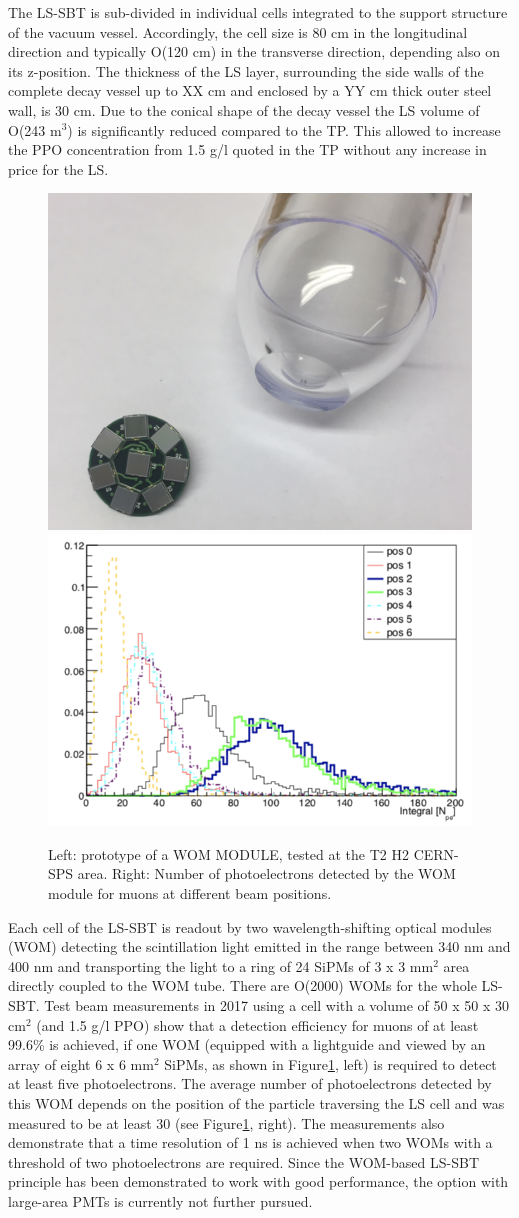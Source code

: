 The LS-SBT is sub-divided in individual cells integrated to the support structure of the vacuum vessel. Accordingly, the cell size is 80 cm in the longitudinal direction and typically O(120 cm) in the transverse direction, depending also on its z-position. The thickness of the LS layer, surrounding the side walls of the complete decay vessel up to XX cm and enclosed by a YY cm thick outer steel wall, is 30 cm. Due to the conical shape of the decay vessel the LS volume of O(243 m$^3$) is significantly reduced compared to the TP.  This allowed to increase the PPO concentration from 1.5 g/l quoted in the TP without any increase in price for the LS.
%
\begin{figure}[h]
\centering
\includegraphics[width=0.35\columnwidth]{figs/DecaySpectrometer/WOM.png}
\includegraphics[width=0.45\columnwidth]{figs/DecaySpectrometer/SBT.png}
\caption{Left: prototype of a WOM MODULE, tested at the T2 H2 CERN-SPS area.
  Right: Number of photoelectrons detected by the WOM module for muons at different beam positions.}
\label{fig:SBT}
\end{figure}
%
Each cell of the LS-SBT is readout by two wavelength-shifting optical modules (WOM) detecting the scintillation light emitted in the range between 340 nm and 400 nm and transporting the light to a ring of 24 SiPMs of 3 x 3 mm$^2$ area directly coupled to the WOM tube. There are O(2000) WOMs for the whole LS-SBT. Test beam measurements in 2017 using a cell with a volume of 50 x 50 x 30 cm$^2$ (and 1.5 g/l PPO) show that a detection efficiency for muons of at least 99.6\% is achieved, if one WOM (equipped with a lightguide and viewed by an array of eight 6 x 6 mm$^2$ SiPMs, as shown in Figure\ref{fig:SBT}, left) is required to detect at least five photoelectrons. The average number of photoelectrons detected by this WOM depends on the position of the particle traversing the LS cell and was measured to be at least 30 (see Figure\ref{fig:SBT}, right). The measurements also demonstrate that a time resolution of 1 ns is achieved when two WOMs with a threshold of two photoelectrons are required.
Since the WOM-based LS-SBT principle has been demonstrated to work with good performance, the option with large-area PMTs is currently not further pursued. 

